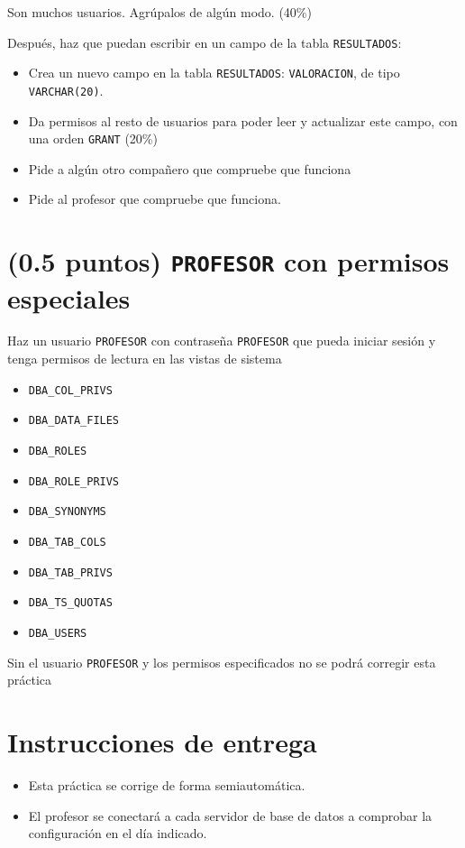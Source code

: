 \documentclass[a4paper]{article}
\begin{document}
\begin{Aviso}
Son muchos usuarios. Agrúpalos de algún modo. (40\%)
\end{Aviso}

Después, haz que puedan escribir en un campo de la tabla \texttt{RESULTADOS}:
\begin{itemize}
\item Crea un nuevo campo en la tabla \texttt{RESULTADOS}: \texttt{VALORACION}, de tipo \texttt{VARCHAR(20)}.
\item Da permisos al resto de usuarios para poder leer y actualizar este campo, con una orden \texttt{GRANT} (20\%)
\item Pide a algún otro compañero que compruebe que funciona
\item Pide al profesor que compruebe que funciona.
\end{itemize}


\section{(0.5 puntos) \texttt{PROFESOR} con permisos especiales}
\label{sec:org000000f}
Haz un usuario \texttt{PROFESOR} con contraseña \texttt{PROFESOR} que pueda iniciar sesión y tenga permisos de lectura en las vistas de sistema
\begin{itemize}
\item \texttt{DBA\_COL\_PRIVS}
\item \texttt{DBA\_DATA\_FILES}
\item \texttt{DBA\_ROLES}
\item \texttt{DBA\_ROLE\_PRIVS}
\item \texttt{DBA\_SYNONYMS}
\item \texttt{DBA\_TAB\_COLS}
\item \texttt{DBA\_TAB\_PRIVS}
\item \texttt{DBA\_TS\_QUOTAS}
\item \texttt{DBA\_USERS}
\end{itemize}


\begin{Aviso}
Sin el usuario \texttt{PROFESOR} y los permisos especificados no se podrá corregir esta práctica
\end{Aviso}
\section*{Instrucciones de entrega}
\label{sec:org0000012}
\begin{itemize}
\item Esta práctica se corrige de forma semiautomática.
\item El profesor se conectará a cada servidor de base de datos a comprobar la configuración en el día indicado.
\end{itemize}
\end{document}
